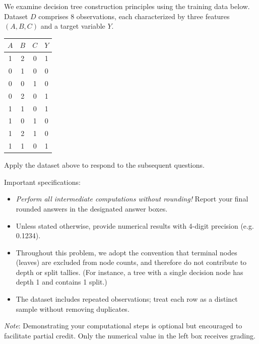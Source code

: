 \documentclass[11pt,addpoints,answers]{exam}
\begin{document}
	We examine decision tree construction principles using the training data below. Dataset \(D\) comprises 8 observations, each characterized by three features \((A, B, C)\) and a target variable \(Y\).
	
	\begin{center}
		\begin{tabular}{|c|c|c|c|}
			\hline
			\(A\) & \(B\) & \(C\) & \(Y\) \\ 
			\hline
			1 & 2 & 0 & 1     \\ 
			\hline
			0 & 1 & 0 & 0     \\ 
			\hline
			0 & 0 & 1 & 0     \\ 
			\hline
			0 & 2 & 0 & 1     \\ 
			\hline
			1 & 1 & 0 & 1     \\ 
			\hline
			1 & 0 & 1 & 0     \\ 
			\hline
			1 & 2 & 1 & 0     \\ 
			\hline
			1 & 1 & 0 & 1     \\ 
			\hline
		\end{tabular}
	\end{center}
	
	Apply the dataset above to respond to the subsequent questions.  
	
	Important specifications:
	\begin{itemize}[leftmargin=*]
		\item \emph{Perform all intermediate computations without rounding!} Report your final rounded answers in the designated answer boxes.
		\item Unless stated otherwise, provide numerical results with 4-digit precision (e.g. 0.1234).
		\item Throughout this problem, we adopt the convention that terminal nodes (leaves) are excluded from node counts, and therefore do not contribute to depth or split tallies. (For instance, a tree with a single decision node has depth 1 and contains 1 split.)
		\item The dataset includes repeated observations; treat each row as a distinct sample without removing duplicates.
	\end{itemize}
	
	\textit{Note}: Demonstrating your computational steps is optional but encouraged to facilitate partial credit. Only the numerical value in the left box receives grading.
	
\end{document}
